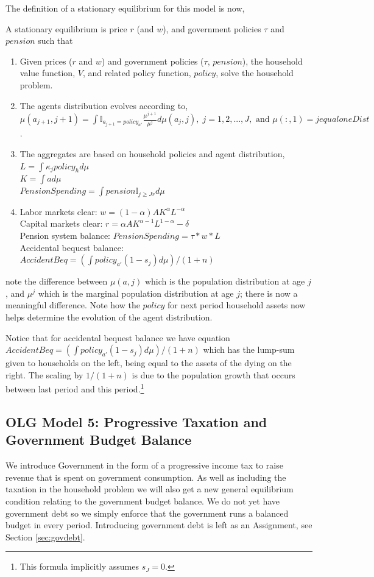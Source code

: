 The definition of a stationary equilibrium for this model is now,
\begin{definition}
 A stationary equilibrium is price $r$ (and $w$), and government policies $\tau$ and $pension$ such that
 \begin{enumerate}
  \item Given prices ($r$ and $w$) and government policies ($\tau$, $pension$), the household value function, $V$, and related policy function, $policy$, solve the household problem.
  \item The agents distribution evolves according to,
   \\  $\mu(a_{j+1},j+1)=\int \mathbb{I}_{a_{j+1}=policy_{a'}} \frac{\mu^{j+1}}{\mu^j} d\mu(a_j,j), \; j=1,2,...,J,\text{ and } \mu(:,1)=jequaloneDist$.
  \item The aggregates are based on household policies and agent distribution,
   \\ $L=\int \kappa_j policy_h d\mu$
   \\ $K=\int a d\mu$
   \\ $PensionSpending=\int pension \mathbb{I}_{j\geq Jr} d\mu$
  \item Labor markets clear: $w=(1-\alpha)A K^{\alpha}L^{-\alpha}$
   \\ Capital markets clear: $r=\alpha A K^{\alpha-1} L^{1-\alpha} - \delta$
   \\ Pension system balance: $PensionSpending=\tau*w*L$
   \\ Accidental bequest balance: $AccidentBeq=(\int policy_{a'}(1-s_j) d\mu)/(1+n)$
 \end{enumerate}
\end{definition}
\noindent note the difference between $\mu(a,j)$ which is the population distribution at age $j$, and $\mu^j$ which is the marginal population distribution at age $j$; there is now a meaningful difference. Note how the $policy$ for next period household assets now helps determine the evolution of the agent distribution.

Notice that for accidental bequest balance we have equation $AccidentBeq=(\int policy_{a'} (1-s_j) d\mu)/(1+n)$ which has the lump-sum given to households on the left, being equal to the assets of the dying on the right. The scaling by $1/(1+n)$ is due to the population growth that occurs between last period and this period.\footnote{This formula implicitly assumes $s_J=0$.}

\subsection{OLG Model 5: Progressive Taxation and Government Budget Balance}
We introduce Government in the form of a progressive income tax to raise revenue that is spent on government consumption. As well as including the taxation in the household problem we will also get a new general equilibrium condition relating to the government budget balance. We do not yet have government debt so we simply enforce that the government runs a balanced budget in every period. Introducing government debt is left as an Assignment, see Section \ref{sec:govdebt}.

